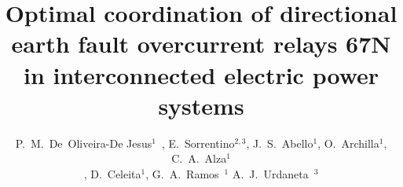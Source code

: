 \documentclass[letterpaper, 10 pt, conference]{IEEEtran}
\begin{document}
\title{Optimal coordination of directional earth fault overcurrent relays  67N in interconnected electric power systems}
%
%
%

\author{ P.~M.~De~Oliveira-De Jesus$^{1}$~, E.~Sorrentino$^{2,3}$, J.~S.~Abello$^{1}$, O.~Archilla$^{1}$, C.~A.~Alza$^{1}$ \\, D.~Celeita$^{1}$, G.~A.~Ramos~$^{1}$ A.~J.~Urdaneta~$^{3}$
}
\end{document}
